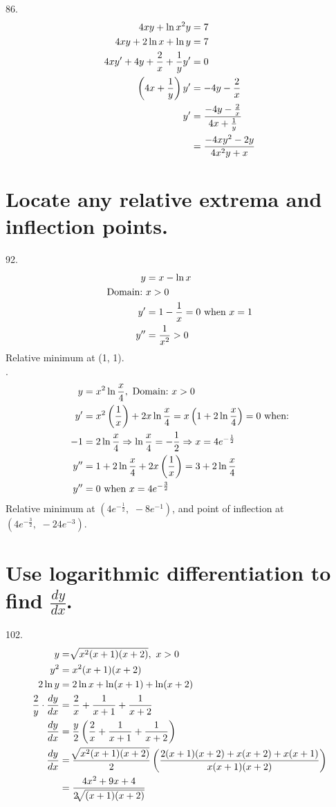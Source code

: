 \documentclass[11pt]{article}
\newcommand*{\vs}{\vspace{1cm}}
\newcommand*{\next}{\noindent}
\newcommand*{\set}{\setcounter{equation}{0}}
\newcommand*{\lt}{\left}
\newcommand*{\rt}{\right}
\begin{document}
86.\begin{align}
    \set
    4xy+\ln x^2y&=7\\
    4xy+2\ln x+\ln y&=7\\
    4xy'+4y+\frac{2}{x}+\frac{1}{y}y'&=0\\
    \lt(4x+\frac{1}{y}\rt)y'&=-4y-\frac{2}{x}\\
    y'&=\frac{-4y-\frac{2}{x}}{4x+\frac{1}{y}}\\
    &=\frac{-4xy^2-2y}{4x^2y+x}
\end{align}

\section{Locate any relative extrema and inflection
points.}
92.\begin{align}
    \set
    y&=x-\ln x\\
    \text{Domain:}\,\,&x>0\\
    y'&=1-\frac{1}{x}=0\,\,\text{when}\,\, x=1\\
    y''&=\frac{1}{x^2}>0
\end{align}
Relative minimum at (1, 1).\\

\vs\next
96.\begin{align}
    \set
    y&=x^2\ln\frac{x}{4},\,\,\text{Domain:}\,\, x>0\\
    y'&=x^2\lt(\frac{1}{x}\rt)+2x\ln\frac{x}{4}=x\lt(1+2\ln\frac{x}{4}\rt)=0\,\,\text{when:}\\
    -1&=2\ln\frac{x}{4}\Rightarrow\ln\frac{x}{4}=-\frac{1}{2}\Rightarrow x=4e^{-\frac{1}{2}}\\
    y''&=1+2\ln\frac{x}{4}+2x\lt(\frac{1}{x}\rt)=3+2\ln\frac{x}{4}\\
    y''&=0\,\,\text{when}\,\, x=4e^{-\frac{3}{2}}
\end{align}
Relative minimum at $(4e^{-\frac{1}{2}},\,\,-8e^{-1})$, and point of inflection at $(4e^{-\frac{3}{2}},\,\,-24e^{-3})$.

\section{Use logarithmic differentiation to find $\frac{dy}{dx}$.}
102.\begin{align}
    \set
    y&=\sqrt[]{x^2(x+1)(x+2)},\,\, x>0\\
    y^2&=x^2(x+1)(x+2)\\
    2\ln y&=2\ln x+\ln(x+1)+\ln(x+2)\\
    \frac{2}{y}\cdot\frac{dy}{dx}&=\frac{2}{x}+\frac{1}{x+1}+\frac{1}{x+2}\\
    \frac{dy}{dx}&=\frac{y}{2}\lt(\frac{2}{x}+\frac{1}{x+1}+\frac{1}{x+2}\rt)\\
    \frac{dy}{dx}&=\frac{\sqrt[]{x^2(x+1)(x+2)}}{2}\lt(\frac{2(x+1)(x+2)+x(x+2)+x(x+1)}{x(x+1)(x+2)}\rt)\\
    &=\frac{4x^2+9x+4}{2\sqrt[]{(x+1)(x+2)}}
\end{align}
\end{document}
